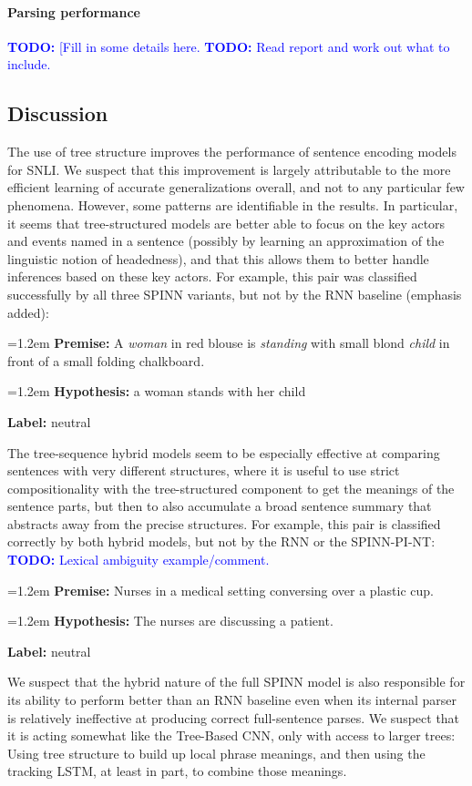 \documentclass[11pt]{article}
\newcommand\todo[1]{\textcolor{blue}{\textbf{TODO:} #1}}
\newcommand{\snli}[3]{{\vspace{0.25em}
{\small \setlength{\parindent}{0.6em} \hangindent=1.2em  \textbf{Premise:} #1\par}\vspace{0.25em}
{\small \setlength{\parindent}{0.6em} \hangindent=1.2em   \textbf{Hypothesis:} #2\par}\vspace{0.25em}
{\small \setlength{\parindent}{0.6em}  \textbf{Label:} #3\par}
}}
\begin{document}
\paragraph{Parsing performance}

\todo{[Fill in some details here.}
\todo{Read report and work out what to include.}

\subsection{Discussion}

The use of tree structure improves the performance of sentence encoding models for SNLI. We suspect that this improvement is largely attributable to the more efficient learning of accurate generalizations overall, and not to any particular few phenomena. However, some patterns are identifiable in the results. In particular, it seems that tree-structured models are better able to focus on the key actors and events named in a sentence (possibly by learning an approximation of the linguistic notion of headedness), and that this allows them to better handle inferences based on these key actors. For example, this pair was classified successfully by all three SPINN variants, but not by the RNN baseline (emphasis added):

\snli
{A \textit{woman} in red blouse is \textit{standing} with small blond \textit{child} in front of a small folding chalkboard.}
{a woman stands with her child}
{neutral}

The tree-sequence hybrid models seem to be especially effective at comparing sentences with very different structures, where it is useful to use strict compositionality with the tree-structured component to get the meanings of the sentence parts, but then to also accumulate a broad sentence summary that abstracts away from the precise structures. For example, this pair is classified correctly by both hybrid models, but not by the RNN or the SPINN-PI-NT: \todo{Lexical ambiguity example/comment.}

\snli{Nurses in a medical setting conversing over a plastic cup.}
{The nurses are discussing a patient.}
{neutral}

We suspect that the hybrid nature of the full SPINN model is also responsible for its ability to perform better than an RNN baseline even when its internal parser is relatively ineffective at producing correct full-sentence parses. We suspect that it is acting somewhat like the Tree-Based CNN, only with access to larger trees: Using tree structure to build up local phrase meanings, and then using the tracking LSTM, at least in part, to combine those meanings.
\end{document}
